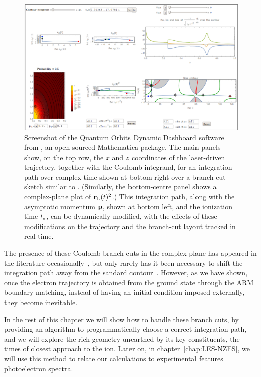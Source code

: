 \begin{figure}[htb]
  \centering
  \includegraphics[width=\textwidth]{5-Quantum-orbits/Figures/figure5M.png}
  \captionsetup{width=\textwidth}
  \caption[
  Screenshot of the Quantum Orbits Dynamic Dashboard software
  ]{
  Screenshot of the Quantum Orbits Dynamic Dashboard software from , an open-sourced Mathematica package. The main panels show, on the top row, the $x$ and $z$ coordinates of the laser-driven trajectory, together with the Coulomb integrand, for an integration path over complex time shown at bottom right over a branch cut sketch similar to . (Similarly, the bottom-centre panel shows a complex-plane plot of $\vb{r}_\mathrm{L}(t)^2$.) This integration path, along with the asymptotic momentum $\vb{p}$, shown at bottom left, and the ionization time ${t_s}$, can be dynamically modified, with the effects of these modifications on the trajectory and the branch-cut layout tracked in real time.
  }
\label{f5-quodd-screenshot}
\end{figure}






The presence of these Coulomb branch cuts in the complex plane has appeared in the literature occasionally~\cite{popruzhenko_branch-cuts_2014}, but only rarely has it been necessary to shift the integration path away from the sandard contour~\cite{ popruzhenko_branch-cuts_2014, Milosevic_scattering_large}. However, as we have shown, once the electron trajectory is obtained from the ground state through the ARM boundary matching, instead of having an initial condition imposed externally, they become inevitable.

In the rest of this chapter we will show how to handle these branch cuts, by providing an algorithm to programmatically choose a correct integration path, and we will explore the rich geometry unearthed by its key constituents, the times of closest approach to the ion. Later on, in chapter~\ref{chap:LES-NZES}, we will use this method to relate our calculations to experimental features photoelectron spectra. 

